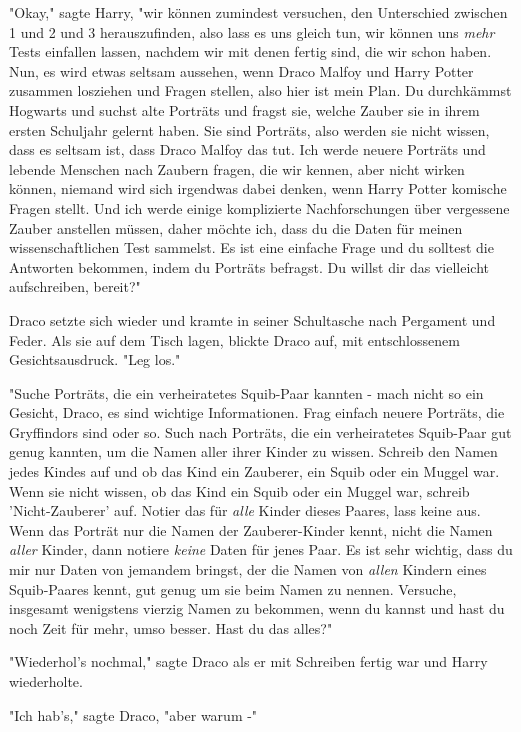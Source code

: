 {"Okay," sagte Harry, "wir können zumindest versuchen, den Unterschied zwischen 1 und 2 und 3 herauszufinden, also lass es uns gleich tun, wir können uns \emph{mehr} Tests einfallen lassen, nachdem wir mit denen fertig sind, die wir schon haben. Nun, es wird etwas seltsam aussehen, wenn Draco Malfoy und Harry Potter zusammen losziehen und Fragen stellen, also hier ist mein Plan. Du durchkämmst Hogwarts und suchst alte Porträts und fragst sie, welche Zauber sie in ihrem ersten Schuljahr gelernt haben. Sie sind Porträts, also werden sie nicht wissen, dass es seltsam ist, dass Draco Malfoy das tut. Ich werde neuere Porträts und lebende Menschen nach Zaubern fragen, die wir kennen, aber nicht wirken können, niemand wird sich irgendwas dabei denken, wenn Harry Potter komische Fragen stellt. Und ich werde einige komplizierte Nachforschungen über vergessene Zauber anstellen müssen, daher möchte ich, dass du die Daten für meinen wissenschaftlichen Test sammelst. Es ist eine einfache Frage und du solltest die Antworten bekommen, indem du Porträts befragst. Du willst dir das vielleicht aufschreiben, bereit?"

Draco setzte sich wieder und kramte in seiner Schultasche nach Pergament und Feder. Als sie auf dem Tisch lagen, blickte Draco auf, mit entschlossenem Gesichtsausdruck. "Leg los."

"Suche Porträts, die ein verheiratetes Squib-Paar kannten - mach nicht so ein Gesicht, Draco, es sind wichtige Informationen. Frag einfach neuere Porträts, die Gryffindors sind oder so. Such nach Porträts, die ein verheiratetes Squib-Paar gut genug kannten, um die Namen aller ihrer Kinder zu wissen. Schreib den Namen jedes Kindes auf und ob das Kind ein Zauberer, ein Squib oder ein Muggel war. Wenn sie nicht wissen, ob das Kind ein Squib oder ein Muggel war, schreib 'Nicht-Zauberer' auf. Notier das für \emph{alle} Kinder dieses Paares, lass keine aus. Wenn das Porträt nur die Namen der Zauberer-Kinder kennt, nicht die Namen \emph{aller} Kinder, dann notiere \emph{keine} Daten für jenes Paar. Es ist sehr wichtig, dass du mir nur Daten von jemandem bringst, der die Namen von \emph{allen} Kindern eines Squib-Paares kennt, gut genug um sie beim Namen zu nennen. Versuche, insgesamt wenigstens vierzig Namen zu bekommen, wenn du kannst und hast du noch Zeit für mehr, umso besser. Hast du das alles?"

"Wiederhol's nochmal," sagte Draco als er mit Schreiben fertig war und Harry wiederholte.

"Ich hab's," sagte Draco, "aber warum -"

}

